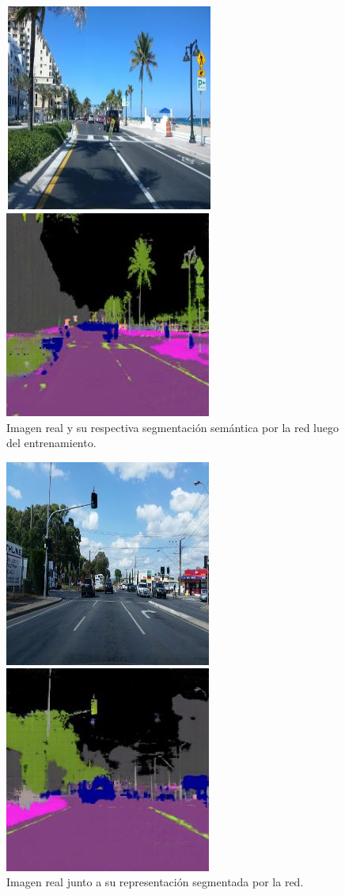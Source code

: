 \documentclass[]{IEEEtran}
\begin{document}
    \begin{figure}[htb]
        \centering
        \includegraphics[width=.4\textwidth]{Imgs/PalmeraRGBSEM.png}    
        \caption{Imagen real y su respectiva segmentación semántica por la red luego del entrenamiento.}
        \label{fig:real-results}
    \end{figure}
    \begin{figure}[htb]
        \centering
        \includegraphics[width=.4\textwidth]{Imgs/SemaforoRGBSEM.png}    
        \caption{Imagen real junto a su representación segmentada por la red.}
        \label{fig:real-results2}
    \end{figure}
\end{document}
